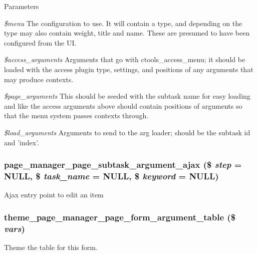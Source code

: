 \begin{DoxyParams}{Parameters}
\item[{\em \$menu}]The configuration to use. It will contain a type, and depending on the type may also contain weight, title and name. These are presumed to have been configured from the UI. \item[{\em \$access\_\-arguments}]Arguments that go with ctools\_\-access\_\-menu; it should be loaded with the access plugin type, settings, and positions of any arguments that may produce contexts. \item[{\em \$page\_\-arguments}]This should be seeded with the subtask name for easy loading and like the access arguments above should contain positions of arguments so that the menu system passes contexts through. \item[{\em \$load\_\-arguments}]Arguments to send to the arg loader; should be the subtask id and 'index'. \end{DoxyParams}
\hypertarget{page_8admin_8inc_a7efab6e6f23dbf0808f9a3fcfb644464}{
\subsubsection[{page\_\-manager\_\-page\_\-subtask\_\-argument\_\-ajax}]{\setlength{\rightskip}{0pt plus 5cm}page\_\-manager\_\-page\_\-subtask\_\-argument\_\-ajax (\$ {\em step} = {\ttfamily NULL}, \/  \$ {\em task\_\-name} = {\ttfamily NULL}, \/  \$ {\em keyword} = {\ttfamily NULL})}}
\label{page_8admin_8inc_a7efab6e6f23dbf0808f9a3fcfb644464}
Ajax entry point to edit an item \hypertarget{page_8admin_8inc_a05df2ed3370fd03d5b411e1cf9fdbd69}{
\subsubsection[{theme\_\-page\_\-manager\_\-page\_\-form\_\-argument\_\-table}]{\setlength{\rightskip}{0pt plus 5cm}theme\_\-page\_\-manager\_\-page\_\-form\_\-argument\_\-table (\$ {\em vars})}}
\label{page_8admin_8inc_a05df2ed3370fd03d5b411e1cf9fdbd69}
Theme the table for this form. 